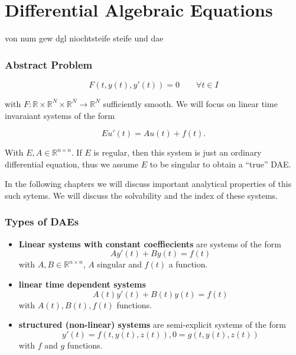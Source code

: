 \chapter{Differential Algebraic Equations}

von num gew dgl niochtsteife steife und dae

\subsection{Abstract Problem}
\begin{equation}
	\label{Abstract_DAE}
	F(t, y(t), y'(t)) = 0 \qquad \forall t \in I
\end{equation}

with $F:\mathbb{R} \times \mathbb{R}^N \times \mathbb{R}^N \to \mathbb{R}^N$ sufficiently smooth. We will focus on linear time invaraiant systems of the form

\begin{displaymath}
	E u'(t) = A u(t) + f(t).
\end{displaymath}

With $E, A \in \mathbb{R}^{n \times n}$. If $E$ is regular, then this system is just an ordinary differential equation, thus we assume $E$ to be singular to obtain a ``true'' DAE. 

In the following chapters we will discuss important analytical properties of this such sytems. We will discuss the solvability and the index of these systems.

\subsection{Types of DAEs}

\begin{itemize}
	\item \textbf{Linear systems with constant coeffiecients} \newline
	are systems of the form 
	\begin{equation}
		\label{DAE-const-coeff}
		A y'(t) + B y(t) = f(t)
	\end{equation}
	with $A,B \in \mathbb{R}^{n \times n}$, $A$ singular and $f(t)$ a function.
	\item \textbf{linear time dependent systems}
	\begin{displaymath}
		A(t) y'(t) + B(t) y(t) = f(t)
	\end{displaymath}
	with $A(t),B(t),f(t)$ functions.
	\item  \textbf{structured (non-linear) systems} \newline
	are semi-explicit systems of the form
	\begin{displaymath}
		y'(t) = f(t, y(t), z(t)),
		0 = g(t,y(t),z(t))
	\end{displaymath}
	with $f$ and $g$ functions.
\end{itemize}

